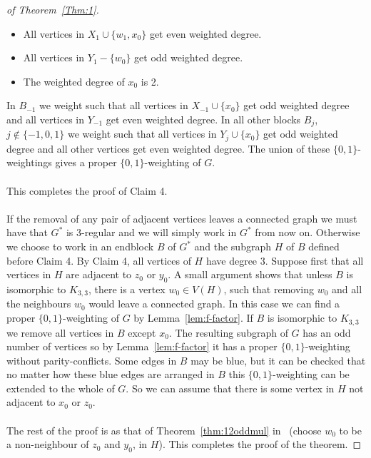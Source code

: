 \documentclass[
final,
 nomarks,
]{dmtcs-episciences}
\theoremstyle{definition}
\begin{document}
\begin{proof}[of Theorem~\ref{Thm:1}]
\begin{itemize}
\item All vertices in $X_1 \cup \{w_1, x_0\}$ get even weighted degree.
\item All vertices in $Y_1 - \{w_0\}$ get odd weighted degree.
\item The weighted degree of $x_0$ is 2.
\end{itemize}
In $B_{-1}$ we weight such that all vertices in $X_{-1} \cup \{x_0\}$ get odd weighted degree and all vertices in $Y_{-1}$ get even weighted degree. In all other blocks $B_j$, $j \notin \{-1,0,1\}$ we weight such that all vertices in $Y_j \cup \{x_0\}$ get odd weighted degree and all other vertices get even weighted degree. The union of these $\{0,1\}$-weightings gives a proper $\{0,1\}$-weighting of $G$.
\\ \\
This completes the proof of Claim 4. \\ \\
If the removal of any pair of adjacent vertices leaves a connected graph we must have that $G^*$ is 3-regular and we will simply work in $G^*$ from now on. Otherwise we choose to work in an endblock $B$ of $G^*$ and the subgraph $H$ of $B$ defined before Claim 4. By Claim 4, all vertices of $H$ have degree 3. Suppose first that all vertices in $H$ are adjacent to $z_0$ or $y_0$. A small argument shows that unless $B$ is isomorphic to $K_{3,3}$, there is a vertex $w_0 \in V(H)$, such that removing $w_0$ and all the neighbours $w_0$ would leave a connected graph. In this case we can find a proper $\{0,1\}$-weighting of $G$ by Lemma~\ref{lem:f-factor}. If $B$ is isomorphic to $K_{3,3}$ we remove all vertices in $B$ except $x_0$. The resulting subgraph of $G$ has an odd number of vertices so by Lemma~\ref{lem:f-factor} it has a proper $\{0,1\}$-weighting without parity-conflicts. Some edges in $B$ may be blue, but it can be checked that no matter how these blue edges are arranged in $B$ this $\{0,1\}$-weighting can be extended to the whole of $G$. So we can assume that there is some vertex in $H$ not adjacent to $x_0$ or $z_0$.    \\ \\
The rest of the proof is as that of Theorem~\ref{thm:12oddmul} in~\cite{TWZ} (choose $w_0$ to be a non-neighbour of $z_0$ and $y_0$, in $H$). This completes the proof of the theorem. 
\end{proof}
\end{document}

